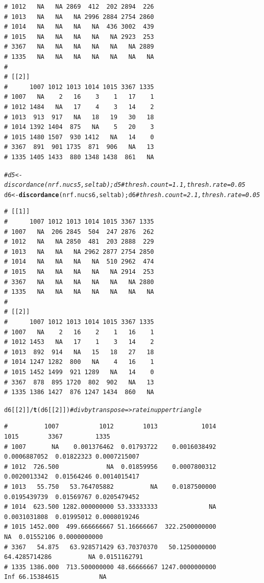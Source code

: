 \documentclass{article}\usepackage[]{graphicx}\usepackage[]{color}
\makeatletter
\newcommand{\hlnum}[1]{\textcolor[rgb]{0.686,0.059,0.569}{#1}}%
\newcommand{\hlcom}[1]{\textcolor[rgb]{0.678,0.584,0.686}{\textit{#1}}}%
\newcommand{\hlopt}[1]{\textcolor[rgb]{0,0,0}{#1}}%
\newcommand{\hlstd}[1]{\textcolor[rgb]{0.345,0.345,0.345}{#1}}%
\newcommand{\hlkwb}[1]{\textcolor[rgb]{0.69,0.353,0.396}{#1}}%
\newcommand{\hlkwd}[1]{\textcolor[rgb]{0.737,0.353,0.396}{\textbf{#1}}}%
\newenvironment{kframe}{%
 \def\at@end@of@kframe{}%
 \ifinner\ifhmode%
  \def\at@end@of@kframe{\end{minipage}}%
  \begin{minipage}{\columnwidth}%
 \fi\fi%
 \def\FrameCommand##1{\hskip\@totalleftmargin \hskip-\fboxsep
 \colorbox{shadecolor}{##1}\hskip-\fboxsep
     \hskip-\linewidth \hskip-\@totalleftmargin \hskip\columnwidth}%
 \MakeFramed {\advance\hsize-\width
   \@totalleftmargin\z@ \linewidth\hsize
   \@setminipage}}%
 {\par\unskip\endMakeFramed%
 \at@end@of@kframe}
\newenvironment{knitrout}{}{} %
\makeatother
\begin{document}
\begin{knitrout}
\begin{kframe}
\begin{verbatim}
# 1012   NA   NA 2869  412  202 2894  226
# 1013   NA   NA   NA 2996 2884 2754 2860
# 1014   NA   NA   NA   NA  436 3002  439
# 1015   NA   NA   NA   NA   NA 2923  253
# 3367   NA   NA   NA   NA   NA   NA 2889
# 1335   NA   NA   NA   NA   NA   NA   NA
# 
# [[2]]
#      1007 1012 1013 1014 1015 3367 1335
# 1007   NA    2   16    3    1   17    1
# 1012 1484   NA   17    4    3   14    2
# 1013  913  917   NA   18   19   30   18
# 1014 1392 1404  875   NA    5   20    3
# 1015 1480 1507  930 1412   NA   14    0
# 3367  891  901 1735  871  906   NA   13
# 1335 1405 1433  880 1348 1438  861   NA
\end{verbatim}
\begin{alltt}
\hlcom{# d5 <- discordance(nrf.nucs5, seltab); d5 # thresh.count=1.1, thresh.rate=0.05}
\hlstd{d6} \hlkwb{<-} \hlkwd{discordance}\hlstd{(nrf.nucs6, seltab); d6} \hlcom{# thresh.count=2.1, thresh.rate=0.05}
\end{alltt}
\begin{verbatim}
# [[1]]
#      1007 1012 1013 1014 1015 3367 1335
# 1007   NA  206 2845  504  247 2876  262
# 1012   NA   NA 2850  481  203 2888  229
# 1013   NA   NA   NA 2962 2877 2754 2850
# 1014   NA   NA   NA   NA  510 2962  474
# 1015   NA   NA   NA   NA   NA 2914  253
# 3367   NA   NA   NA   NA   NA   NA 2880
# 1335   NA   NA   NA   NA   NA   NA   NA
# 
# [[2]]
#      1007 1012 1013 1014 1015 3367 1335
# 1007   NA    2   16    2    1   16    1
# 1012 1453   NA   17    1    3   14    2
# 1013  892  914   NA   15   18   27   18
# 1014 1247 1282  800   NA    4   16    1
# 1015 1452 1499  921 1289   NA   14    0
# 3367  878  895 1720  802  902   NA   13
# 1335 1386 1427  876 1247 1434  860   NA
\end{verbatim}
\begin{alltt}
\hlstd{d6[[}\hlnum{2}\hlstd{]]}\hlopt{/}\hlkwd{t}\hlstd{(d6[[}\hlnum{2}\hlstd{]])} \hlcom{# div by transpose => rate in upper triangle}
\end{alltt}
\begin{verbatim}
#          1007           1012        1013            1014          1015        3367         1335
# 1007       NA    0.001376462  0.01793722    0.0016038492  0.0006887052  0.01822323 0.0007215007
# 1012  726.500             NA  0.01859956    0.0007800312  0.0020013342  0.01564246 0.0014015417
# 1013   55.750   53.764705882          NA    0.0187500000  0.0195439739  0.01569767 0.0205479452
# 1014  623.500 1282.000000000 53.33333333              NA  0.0031031808  0.01995012 0.0008019246
# 1015 1452.000  499.666666667 51.16666667  322.2500000000            NA  0.01552106 0.0000000000
# 3367   54.875   63.928571429 63.70370370   50.1250000000 64.4285714286          NA 0.0151162791
# 1335 1386.000  713.500000000 48.66666667 1247.0000000000           Inf 66.15384615           NA
\end{verbatim}
\end{kframe}
\end{knitrout}
\end{document}
